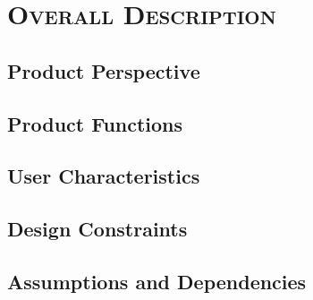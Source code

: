 \documentclass[ProjectRequirements.tex]{subfiles}
\begin{document}
\bigskip

\section{\textsc{\Large Overall Description}}
	\subsection{Product Perspective}
	\subsection{Product Functions}
	\subsection{User Characteristics}
	\subsection{Design Constraints}
	\subsection{Assumptions and Dependencies}
\end{document}
